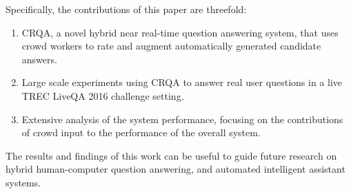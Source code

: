 Specifically, the contributions of this paper are threefold:
\begin{enumerate}
	\item CRQA, a novel hybrid near real-time question answering system, that uses crowd workers to rate and augment automatically generated candidate answers.
	\item Large scale experiments using CRQA to answer real user questions in a live TREC LiveQA 2016 challenge setting.
	\item Extensive analysis of the system performance, focusing on the contributions of crowd input to the performance of the overall system.
\end{enumerate}

The results and findings of this work can be useful to guide future research on hybrid human-computer question answering, and automated intelligent assistant systems.


